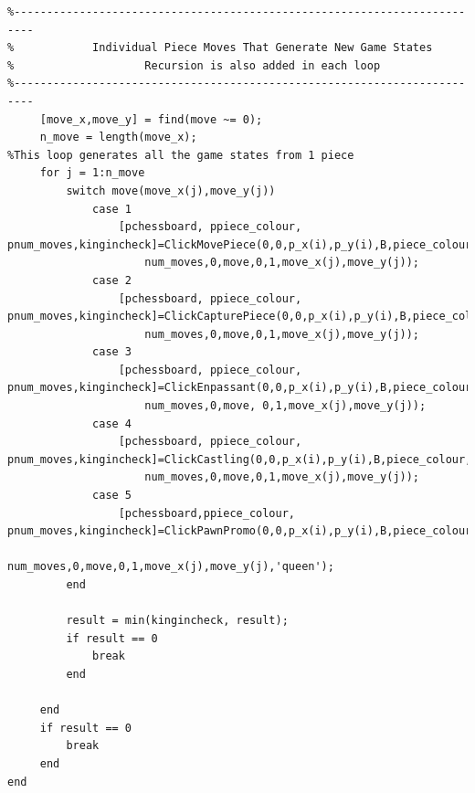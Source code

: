 \documentclass[11pt,a4paper]{article}
\begin{document}
\begin{lstlisting}
%-------------------------------------------------------------------------
%            Individual Piece Moves That Generate New Game States
%                    Recursion is also added in each loop
%-------------------------------------------------------------------------
     [move_x,move_y] = find(move ~= 0);
     n_move = length(move_x);
%This loop generates all the game states from 1 piece
     for j = 1:n_move
         switch move(move_x(j),move_y(j))
             case 1
                 [pchessboard, ppiece_colour, pnum_moves,kingincheck]=ClickMovePiece(0,0,p_x(i),p_y(i),B,piece_colour,chessboard,...
                     num_moves,0,move,0,1,move_x(j),move_y(j));
             case 2
                 [pchessboard, ppiece_colour, pnum_moves,kingincheck]=ClickCapturePiece(0,0,p_x(i),p_y(i),B,piece_colour,chessboard,...
                     num_moves,0,move,0,1,move_x(j),move_y(j));
             case 3
                 [pchessboard, ppiece_colour, pnum_moves,kingincheck]=ClickEnpassant(0,0,p_x(i),p_y(i),B,piece_colour,chessboard,...
                     num_moves,0,move, 0,1,move_x(j),move_y(j));
             case 4
                 [pchessboard, ppiece_colour, pnum_moves,kingincheck]=ClickCastling(0,0,p_x(i),p_y(i),B,piece_colour,chessboard,...
                     num_moves,0,move,0,1,move_x(j),move_y(j));
             case 5
                 [pchessboard,ppiece_colour, pnum_moves,kingincheck]=ClickPawnPromo(0,0,p_x(i),p_y(i),B,piece_colour,chessboard,...
                     num_moves,0,move,0,1,move_x(j),move_y(j),'queen');
         end
         
         result = min(kingincheck, result);
         if result == 0
             break
         end
         
     end
     if result == 0
         break
     end
end
\end{lstlisting}
\end{document}

